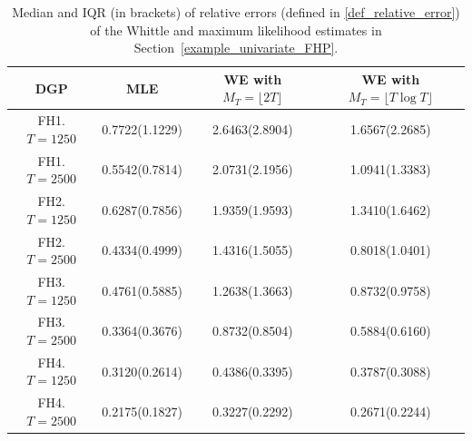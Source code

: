 \documentclass[11pt]{article}
\numberwithin{equation}{section}
\theoremstyle{plain}
\theoremstyle{definition}
\theoremstyle{definition}
\theoremstyle{assumption}
\theoremstyle{proposition}
\theoremstyle{proposition}
\theoremstyle{example}
\theoremstyle{lemma}
\theoremstyle{theorem}
\theoremstyle{remark}
\begin{document}
\begin{table}[!h]
\caption{Median and IQR (in brackets) of relative errors (defined in \eqref{def_relative_error}) of the Whittle and maximum likelihood estimates  in Section~\ref{example_univariate_FHP}.}
\label{table_comparison_uniFH}
\begin{center}
\begin{tabular}{|c c c c|} 
 \hline
 DGP & MLE & WE with $M_T = \lfloor 2T\rfloor$ & WE with $M_T = \lfloor T\log T\rfloor$  \\ [0.5ex] 
 \hline\hline
 FH1. $T=1250$ & 0.7722(1.1229) & 2.6463(2.8904) & 1.6567(2.2685) \\ 
 \hline
 FH1. $T=2500$ & 0.5542(0.7814) & 2.0731(2.1956) & 1.0941(1.3383)\\
 \hline
 \hline
 FH2. $T=1250$ & 0.6287(0.7856) & 1.9359(1.9593) & 1.3410(1.6462)\\
 \hline
 FH2. $T=2500$ & 0.4334(0.4999) & 1.4316(1.5055) & 0.8018(1.0401)\\ 
 \hline
 \hline
 FH3. $T=1250$ & 0.4761(0.5885) & 1.2638(1.3663) & 0.8732(0.9758)\\
 \hline
 FH3. $T=2500$ & 0.3364(0.3676) & 0.8732(0.8504) & 0.5884(0.6160)\\
 \hline
 \hline
 FH4. $T=1250$ &  0.3120(0.2614) & 0.4386(0.3395) & 0.3787(0.3088) \\ 
 \hline
 FH4. $T=2500$ &  0.2175(0.1827) & 0.3227(0.2292) & 0.2671(0.2244)\\
 \hline
\end{tabular}
\end{center}
\end{table}
\end{document}
